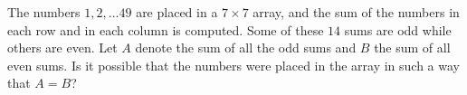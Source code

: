 The numbers $1, 2, \ldots 49$ are placed in a $7\times 7$ array, and the sum of the numbers in each row and in each column is computed. Some of these $14$ sums are odd while others are even. Let $A$ denote the sum of all the odd sums and $B$ the sum of all even sums. Is it possible that the numbers were placed in the array in such a way that $A = B$?